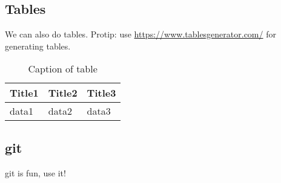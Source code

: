 \subsection{Tables}

We can also do tables. Protip: use \url{https://www.tablesgenerator.com/} for generating tables.
\begin{table}[H]
\centering
\caption{Caption of table}
\label{TableLabel}
\begin{tabular}{|l|l|l|}
\hline
Title1 & Title2 & Title3 \\ \hline
data1  & data2  & data3  \\ \hline
\end{tabular}
\end{table}

\subsection{\gls{git}}

\gls{git} is fun, use it!